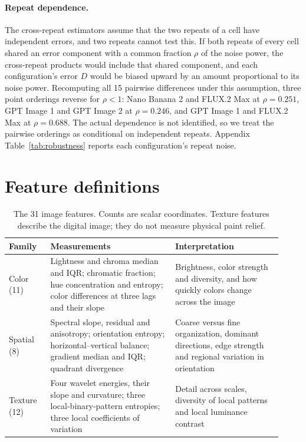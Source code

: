 \paragraph{Repeat dependence.}
The cross-repeat estimators assume that the two repeats of a cell have independent errors, and
two repeats cannot test this. If both repeats of every cell shared an error component with a
common fraction $\rho$ of the noise power, the cross-repeat products would include that shared
component, and each configuration's error $D$ would be biased upward by an amount proportional
to its noise power. Recomputing all 15 pairwise differences under this assumption, three point
orderings reverse for $\rho<1$: Nano Banana 2 and FLUX.2 Max at $\rho=0.251$, GPT Image 1 and
GPT Image 2 at $\rho=0.246$, and GPT Image 1 and FLUX.2 Max at $\rho=0.688$. The actual
dependence is not identified, so we treat the pairwise orderings as conditional on independent
repeats. Appendix Table~\ref{tab:robustness} reports each configuration's repeat noise.

\FloatBarrier
\section{Feature definitions}\label{app:features}

\begin{table}[ht]
\caption{The 31 image features. Counts are scalar coordinates. Texture features describe the
digital image; they do not measure physical paint relief.}
\label{tab:features}
\vspace{2pt}
\centering\small
\begin{tabular}{@{}p{0.14\linewidth}p{0.42\linewidth}p{0.36\linewidth}@{}}
\toprule
Family & Measurements & Interpretation\\
\midrule
Color (11) & Lightness and chroma median and IQR; chromatic fraction; hue concentration and
entropy; color differences at three lags and their slope & Brightness, color strength and
diversity, and how quickly colors change across the image\\[3pt]
Spatial (8) & Spectral slope, residual and anisotropy; orientation entropy;
horizontal--vertical balance; gradient median and IQR; quadrant divergence & Coarse versus fine
organization, dominant directions, edge strength and regional variation in orientation\\[3pt]
Texture (12) & Four wavelet energies, their slope and curvature; three local-binary-pattern
entropies; three local coefficients of variation & Detail across scales, diversity of local
patterns and local luminance contrast\\
\bottomrule
\end{tabular}
\end{table}

